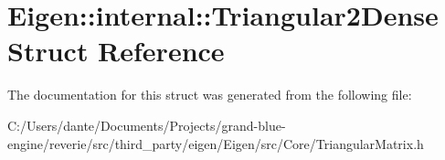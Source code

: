 \hypertarget{struct_eigen_1_1internal_1_1_triangular2_dense}{}\section{Eigen\+::internal\+::Triangular2\+Dense Struct Reference}
\label{struct_eigen_1_1internal_1_1_triangular2_dense}


The documentation for this struct was generated from the following file\+:\begin{DoxyCompactItemize}
\item 
C\+:/\+Users/dante/\+Documents/\+Projects/grand-\/blue-\/engine/reverie/src/third\+\_\+party/eigen/\+Eigen/src/\+Core/Triangular\+Matrix.\+h\end{DoxyCompactItemize}
